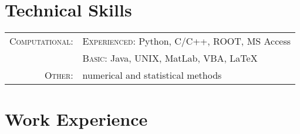 \documentclass[letterpaper,10pt]{article}
\begin{document}
\section{Technical Skills}
\begin{tabular}{rp{11cm}}
 \textsc{Computational:}& \textsc{Experienced:} Python, C/C++, ROOT, MS Access \\
 				 	& \textsc{Basic:} Java, UNIX, MatLab, VBA, {\fb \LaTeX}\setmainfont[SmallCapsFont=Fontin-SmallCaps.otf]{Fontin.otf} \\
 \textsc{Other:}& numerical and statistical methods%
\end{tabular}

\section{Work Experience}
\end{document}
